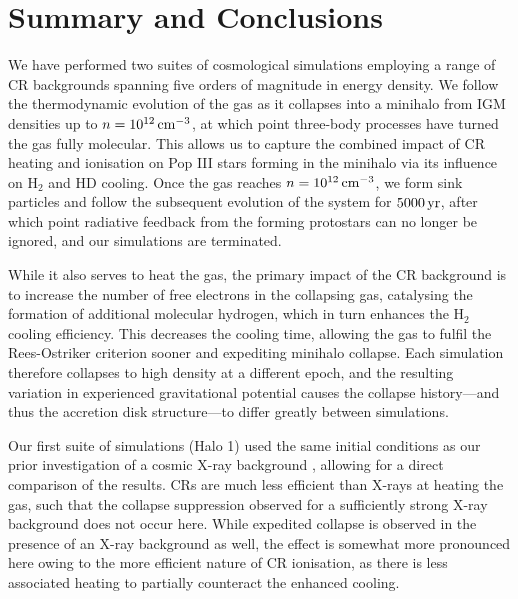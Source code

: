\documentclass[usenatbib]{mn2e}
\newcommand{\cc}{\,{\rm cm}^{-3}}
\newcommand{\yr}{\,{\rm yr}}
\newcommand{\htwo}{\mathrm{H}_2}
\newcommand{\hd}{\mathrm{HD}}
\begin{document}
\section{Summary and Conclusions}
\label{conclusions}

We have performed two suites of cosmological simulations employing a range of CR backgrounds spanning five orders of magnitude in energy density. 
We follow the thermodynamic evolution of the gas as it collapses into a minihalo from IGM densities up to $n=10^{12}\cc$, at which point three-body processes have turned the gas fully molecular. 
This allows us to capture the combined impact of CR heating and ionisation on Pop III stars forming in the minihalo via its influence on $\htwo$ and $\hd$ cooling.
Once the gas reaches $n=10^{12}\cc$, we form sink particles and follow the subsequent evolution of the system for $5000\yr$, after which point radiative feedback from the forming protostars can no longer be ignored, and our simulations are terminated.

While it also serves to heat the gas, the primary impact of the CR background is to increase the number of free electrons in the collapsing gas, catalysing the formation of additional molecular hydrogen, which in turn enhances the $\htwo$ cooling efficiency.  
This decreases the cooling time, allowing the gas to fulfil the Rees-Ostriker criterion sooner and expediting minihalo collapse. 
Each simulation therefore collapses to high density at a different epoch, and the resulting variation in experienced gravitational potential causes the collapse history---and thus the accretion disk structure---to differ greatly between simulations.

Our first suite of simulations (Halo 1) used the same initial conditions as our prior investigation of a cosmic X-ray background \citep{Hummeletal2015}, allowing for a direct comparison of the results.
CRs are much less efficient than X-rays at heating the gas, such that the collapse suppression observed for a sufficiently strong X-ray background does not occur here.  
While expedited collapse is observed in the presence of an X-ray background as well, the effect is somewhat more pronounced here owing to the more efficient nature of CR ionisation, as there is less associated heating to partially counteract the enhanced cooling.
\end{document}
